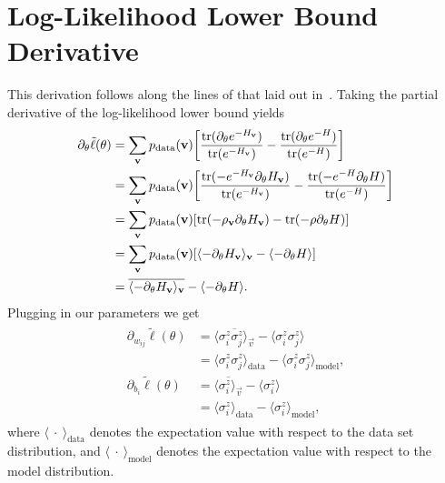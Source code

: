 \section{Log-Likelihood Lower Bound Derivative}\label{app:qbm_log_likelihood_lower_bound_derivative}
This derivation follows along the lines of that laid out in~\cite{amin_2018}.
Taking the partial derivative of the log-likelihood lower bound yields
\begin{align}
\begin{split}
    \label{eq:qbm_log_likelihood_derivative_lower_bound}
    \partial_\theta \tilde{\ell}(\theta)
        &= \sum_{\mathbf{v}} p_{\text{data}}(\mathbf{v}) \bigg[ \frac{\text{tr}(\partial_\theta e^{-H_{\mathbf{v}}})}{\text{tr}(e^{-H_{\mathbf{v}}})} - \frac{\text{tr}(\partial_\theta e^{-H})}{\text{tr}(e^{-H})} \bigg] \\
        &= \sum_{\mathbf{v}} p_{\text{data}}(\mathbf{v}) \bigg[ \frac{\text{tr}(-e^{-H_{\mathbf{v}}} \partial_\theta H_{\mathbf{v}})}{\text{tr}(e^{-H_{\mathbf{v}}})} - \frac{\text{tr}(-e^{-H} \partial_\theta H)}{\text{tr}(e^{-H})} \bigg] \\
        &= \sum_{\mathbf{v}} p_{\text{data}}(\mathbf{v}) [ \text{tr}(-\rho_{\mathbf{v}} \partial_\theta H_{\mathbf{v}}) - \text{tr}(-\rho \partial_\theta H) ] \\
        &= \sum_{\mathbf{v}} p_{\text{data}}(\mathbf{v}) [ \langle -\partial_\theta H_{\mathbf{v}} \rangle_{\mathbf{v}} - \langle -\partial_\theta H \rangle ] \\
        &= \overline{\langle -\partial_\theta H_{\mathbf{v}} \rangle_{\mathbf{v}}} - \langle -\partial_\theta H \rangle.
\end{split}
\end{align}
Plugging in our parameters we get
\begin{align}
\begin{split}
    \label{eq:qbm_log_likelihood_partials}
    \partial_{w_{ij}} \tilde{\ell}(\theta)
        &= \overline{\langle \sigma_i^z \sigma_j^z \rangle_\vec{v}} - \langle \sigma_i^z \sigma_j^z \rangle \\
        &= \langle \sigma_i^z \sigma_j^z \rangle_\text{data} - \langle \sigma_i^z \sigma_j^z \rangle_\text{model}, \\
    \partial_{b_i} \tilde{\ell}(\theta)
        &= \overline{\langle \sigma_i^z \rangle_\vec{v}} - \langle \sigma_i^z \rangle \\
        &= \langle \sigma_i^z \rangle_\text{data} - \langle \sigma_i^z \rangle_\text{model},
\end{split}
\end{align}
where \( \langle \ \cdot \ \rangle_{\text{data}} \) denotes the expectation value with respect to the data set distribution, and \( \langle \ \cdot \ \rangle_{\text{model}} \) denotes the expectation value with respect to the model distribution.

